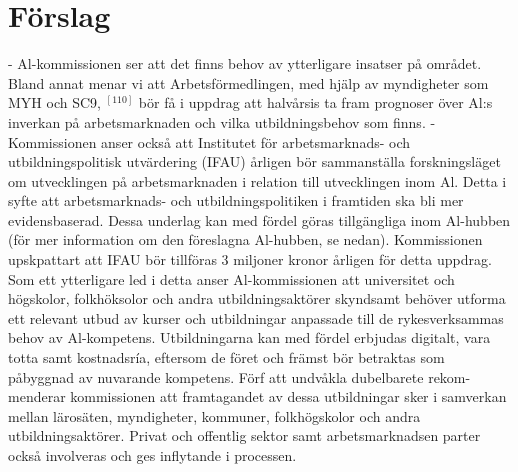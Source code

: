 {\section*{Förslag}
- Al-kommissionen ser att det finns behov av ytterligare insatser på området. Bland annat menar vi att Arbetsförmedlingen, med hjälp av myndigheter som MYH och SC9, \({ }^{[110]}\) bör få i uppdrag att halvårsis ta fram prognoser över Al:s inverkan på arbetsmarknaden och vilka utbildningsbehov som finns.
- Kommissionen anser också att Institutet för arbetsmarknads- och utbildningspolitisk utvärdering (IFAU) årligen bör sammanställa forskningsläget om utvecklingen på arbetsmarknaden i relation till utvecklingen inom Al. Detta i syfte att arbetsmarknads- och utbildningspolitiken i framtiden ska bli mer evidensbaserad. Dessa underlag kan med fördel göras tillgängliga inom Al-hubben (för mer information om den föreslagna Al-hubben, se nedan). Kommissionen upskpattart att IFAU bör tillföras 3 miljoner kronor årligen för detta uppdrag.
Som ett ytterligare led i detta anser Al-kommissionen att universitet och högskolor, folkhöksolor och andra utbildningsaktörer skyndsamt behöver utforma ett relevant utbud av kurser och utbildningar anpassade till de rykesverksammas behov av Al-kompetens. Utbildningarna kan med fördel erbjudas digitalt, vara totta samt kostnadsría, eftersom de föret och främst bör betraktas som påbyggnad av nuvarande kompetens. Förf att undvåkla dubelbarete rekom- menderar kommissionen att framtagandet av dessa utbildningar sker i samverkan mellan lärosäten, myndigheter, kommuner, folkhögskolor och andra utbildningsaktörer. Privat och offentlig sektor samt arbetsmarknadsen parter också involveras och ges inflytande i processen.
}
